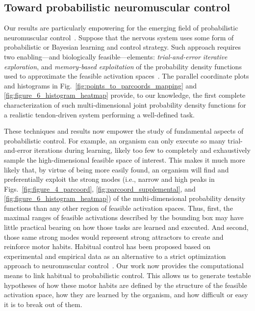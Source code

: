 \documentclass[letterpaper]{article}
\begin{document}
\subsection*{Toward probabilistic neuromuscular control}

Our results are particularly empowering for the emerging field of probabilistic neuromuscular control~\cite{kording2004bayesian, Kording2014130,berniker2013examination,sanger2011distributed }. Suppose that the nervous system uses some form of probabilistic or Bayesian learning and control strategy. Such approach requires two enabling---and biologically feasible---elements: \emph{trial-and-error iterative exploration}, and \emph{ memory-based exploitation} of the probability density functions used to approximate the feasible activation spaces~\cite{kording2004bayesian}. The parallel coordinate plots and histograms in Fig.~\ref{fig:points_to_parcoords_mapping} and \ref{fig:figure_6_histogram_heatmap} provide, to our knowledge, the first complete~\cite{smith1984efficient,lovasz1999hit} characterization of such multi-dimensional joint probability density functions for a realistic tendon-driven system performing a well-defined task.

These techniques and results now empower the study of fundamental aspects of probabilistic control. For example, an organism can only execute so many trial-and-error iterations during learning, likely too few to completely and exhaustively sample the high-dimensional feasible space of interest. This makes it much more likely that, by virtue of being more easily found, an organism will find and preferentially exploit the strong modes (i.e., narrow and high peaks in Figs.~\ref{fig:figure_4_parcoord}, \ref{fig:parcoord_supplemental}, and \ref{fig:figure_6_histogram_heatmap}) of the multi-dimensional probability density functions than any other region of feasible activation spaces. Thus, first, the maximal ranges of feasible activations described by the bounding box \cite{sohn2013cat_bounding_box,Valero-Cuevas2015high-dimensional} may have little practical bearing on how those tasks are learned and executed. And second, those same strong modes would represent strong attractors to create and reinforce motor habits. Habitual control has been proposed based on experimental and empirical data as an alternative to a strict optimization approach to neuromuscular control~\cite{deRugy2012habitual}. Our work now provides the computational means to link habitual to probabilistic control. This allows us to generate testable hypotheses of how these motor habits are defined by the structure of the feasible activation space, how they are learned by the organism, and how difficult or easy it is to break out of them.
\end{document}
